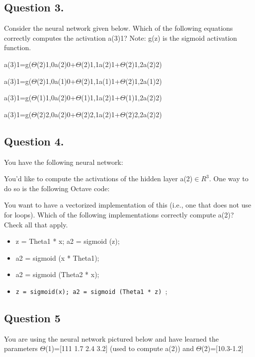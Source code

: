 \documentclass[11pt]{article} %
\begin{document}
\subsection*{Question 3. }
Consider the neural network given below. Which of the following equations correctly computes the activation a(3)1? Note: g(z) is the sigmoid activation function.



a(3)1=g($\Theta$(2)1,0a(2)0+$\Theta$(2)1,1a(2)1+$\Theta$(2)1,2a(2)2)

a(3)1=g($\Theta$(2)1,0a(1)0+$\Theta$(2)1,1a(1)1+$\Theta$(2)1,2a(1)2)

a(3)1=g($\Theta$(1)1,0a(2)0+$\Theta$(1)1,1a(2)1+$\Theta$(1)1,2a(2)2)

a(3)1=g($\Theta$(2)2,0a(2)0+$\Theta$(2)2,1a(2)1+$\Theta$(2)2,2a(2)2)
\subsection*{Question 4. }
You have the following neural network:


You'd like to compute the activations of the hidden layer a(2)$\in R^3$. One way to do so is the following Octave code:


You want to have a vectorized implementation of this (i.e., one that does not use for loops). Which of the following implementations correctly compute a(2)? Check all that apply.

\begin{itemize}
\item z = Theta1 * x; a2 = sigmoid (z);

\item a2 = sigmoid (x * Theta1);

\item a2 = sigmoid (Theta2 * x);

\item \texttt{z = sigmoid(x); a2 = sigmoid (Theta1 * z) };
\end{itemize}


\subsection*{Question 5}

You are using the neural network pictured below and have learned the parameters 
$\Theta$(1)=[111 1.7 2.4 3.2] 
(used to compute a(2)) and $\Theta$(2)=[10.3-1.2] 
\end{document}
